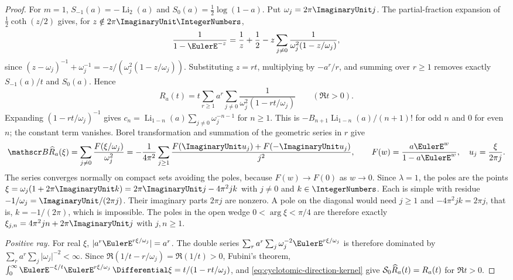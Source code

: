 \begin{proof}
For \(m=1\), \(S_{-1}(a)=-\operatorname{Li}_2(a)\) and
\(S_0(a)=\tfrac12\log(1-a)\).  Put \(\omega_j=2\pi\ImaginaryUnit j\).  The
partial-fraction expansion of \(\tfrac12\coth(z/2)\) gives, for
\(z\notin2\pi\ImaginaryUnit\IntegerNumbers\),
\[
 \frac1{1-\EulerE^{-z}}
  =\frac1z+\frac12
   -z\sum_{j\ne0}\frac1{\omega_j^2(1-z/\omega_j)},
\]
since \((z-\omega_j)^{-1}+\omega_j^{-1}=-z/(\omega_j^2(1-z/\omega_j))\).
Substituting \(z=rt\), multiplying by \(-a^r/r\), and summing over \(r\ge1\)
removes exactly \(S_{-1}(a)/t\) and \(S_0(a)\).  Hence
\begin{equation}
 R_a(t)=t\sum_{r\ge1}a^r\sum_{j\ne0}\frac1{\omega_j^2(1-rt/\omega_j)}
 \qquad(\Re t>0).
 \label{eq:cyclotomic-direction-kernel}
\end{equation}
Expanding \((1-rt/\omega_j)^{-1}\) gives
\(c_n=\operatorname{Li}_{1-n}(a)\sum_{j\ne0}\omega_j^{-n-1}\) for \(n\ge1\).
This is \(-B_{n+1}\operatorname{Li}_{1-n}(a)/(n+1)!\) for odd \(n\) and \(0\) for
even \(n\); the constant term vanishes.  Borel transformation and summation of the geometric
series in \(r\) give
\[
 \mathscr B\FormalGevreySeriesSymbol{R}_a(\xi)
  =\sum_{j\ne0}\frac{F(\xi/\omega_j)}{\omega_j^2}
  =-\frac1{4\pi^2}\sum_{j\ge1}\frac{F(\ImaginaryUnit u_j)+F(-\ImaginaryUnit u_j)}{j^2},
 \qquad
 F(w)=\frac{a\EulerE^{w}}{1-a\EulerE^{w}},\quad u_j=\frac{\xi}{2\pi j}.
\]
The series converges normally on compact sets avoiding the poles, because
\(F(w)\to F(0)\) as \(w\to0\).  Since \(\lambda=1\), the poles are the points
\(\xi=\omega_j(1+2\pi\ImaginaryUnit k)=2\pi\ImaginaryUnit j-4\pi^2jk\) with
\(j\ne0\) and \(k\in\IntegerNumbers\).  Each is simple with residue
\(-1/\omega_j=\ImaginaryUnit/(2\pi j)\).  Their imaginary parts \(2\pi j\) are
nonzero.  A pole on the diagonal would need \(j\ge1\) and \(-4\pi^2jk=2\pi j\),
that is, \(k=-1/(2\pi)\), which is impossible.  The poles in the open wedge
\(0<\arg\xi<\pi/4\) are therefore exactly
\(\xi_{j,n}=4\pi^2jn+2\pi\ImaginaryUnit j\) with \(j,n\ge1\).

\emph{Positive ray.}  For real \(\xi\), \(\lvert a^r\EulerE^{r\xi/\omega_j}\rvert=a^r\).
The double series \(\sum_r a^r\sum_j\omega_j^{-2}\EulerE^{r\xi/\omega_j}\) is
therefore dominated by \(\sum_ra^r\sum_j\lvert\omega_j\rvert^{-2}<\infty\).
Since \(\Re(1/t-r/\omega_j)=\Re(1/t)>0\), Fubini's theorem,
\(\int_0^\infty\EulerE^{-\xi/t}\EulerE^{r\xi/\omega_j}\,\Differential\xi
 =t/(1-rt/\omega_j)\), and \eqref{eq:cyclotomic-direction-kernel} give
\(\mathcal S_0\widehat{R}_a(t)=R_a(t)\) for \(\Re t>0\).


\end{proof}
